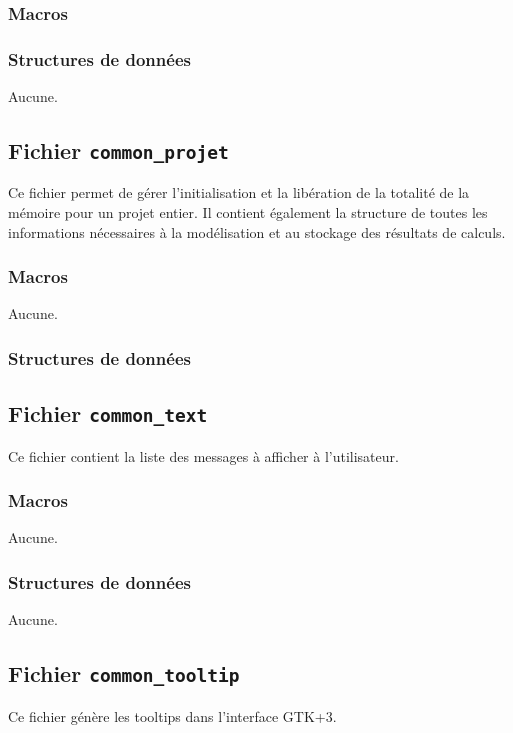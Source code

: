 \documentclass{article}
\begin{document}
\subsubsection{Macros}

\subsubsection{Structures de données}
Aucune.






\subsection{Fichier {\texttt{common\_projet}}}
Ce fichier permet de gérer l'initialisation et la libération de la totalité de la mémoire pour un projet entier. Il contient également la structure de toutes les informations nécessaires à la modélisation et au stockage des résultats de calculs.
\subsubsection{Macros}
Aucune.
\subsubsection{Structures de données}





\subsection{Fichier {\texttt{common\_text}}}
Ce fichier contient la liste des messages à afficher à l'utilisateur.
\subsubsection{Macros}
Aucune.
\subsubsection{Structures de données}
Aucune.




\subsection{Fichier {\texttt{common\_tooltip}}}
Ce fichier génère les tooltips dans l'interface GTK+3.
\end{document}
